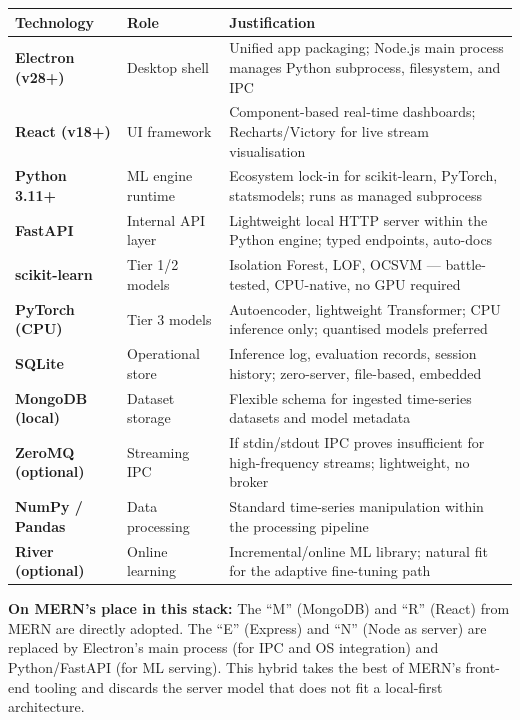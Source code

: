 \documentclass[11pt, a4paper]{article}
\begin{document}
\vspace{4pt}
\begin{tabularx}{\linewidth}{>{\bfseries\color{primary}}p{3.6cm}
  >{\small}p{3.0cm} X}
\toprule
\rowcolor{primary!8}
\color{primary}Technology & \color{primary}Role & \color{primary}Justification\\
\midrule
Electron (v28+) & Desktop shell & Unified app packaging; Node.js main process manages Python subprocess, filesystem, and IPC\\
\addlinespace[3pt]
React (v18+) & UI framework & Component-based real-time dashboards; Recharts/Victory for live stream visualisation\\
\addlinespace[3pt]
Python 3.11+ & ML engine runtime & Ecosystem lock-in for scikit-learn, PyTorch, statsmodels; runs as managed subprocess\\
\addlinespace[3pt]
FastAPI & Internal API layer & Lightweight local HTTP server within the Python engine; typed endpoints, auto-docs\\
\addlinespace[3pt]
scikit-learn & Tier 1/2 models & Isolation Forest, LOF, OCSVM — battle-tested, CPU-native, no GPU required\\
\addlinespace[3pt]
PyTorch (CPU) & Tier 3 models & Autoencoder, lightweight Transformer; CPU inference only; quantised models preferred\\
\addlinespace[3pt]
SQLite & Operational store & Inference log, evaluation records, session history; zero-server, file-based, embedded\\
\addlinespace[3pt]
MongoDB (local) & Dataset storage & Flexible schema for ingested time-series datasets and model metadata\\
\addlinespace[3pt]
ZeroMQ (optional) & Streaming IPC & If stdin/stdout IPC proves insufficient for high-frequency streams; lightweight, no broker\\
\addlinespace[3pt]
NumPy / Pandas & Data processing & Standard time-series manipulation within the processing pipeline\\
\addlinespace[3pt]
River (optional) & Online learning & Incremental/online ML library; natural fit for the adaptive fine-tuning path\\
\bottomrule
\end{tabularx}

\vspace{8pt}
\begin{notebox}
\noindent\textbf{On MERN's place in this stack:}
The ``M'' (MongoDB) and ``R'' (React) from MERN are directly adopted.
The ``E'' (Express) and ``N'' (Node as server) are replaced by
Electron's main process (for IPC and OS integration) and Python/FastAPI
(for ML serving). This hybrid takes the best of MERN's front-end tooling
and discards the server model that does not fit a local-first architecture.
\end{notebox}
\end{document}
